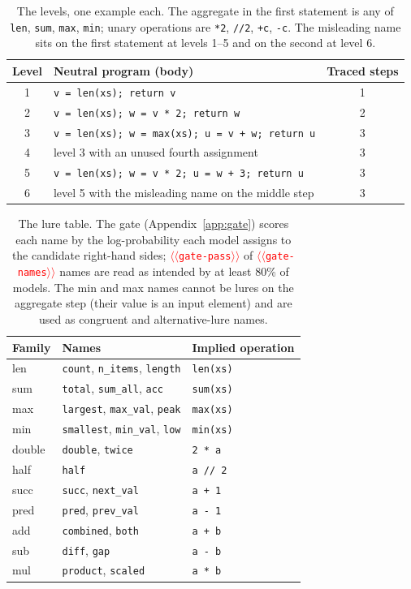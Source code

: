 \documentclass[11pt]{article}
\providecommand{\NUM}[1]{\textcolor{red}{$\langle\langle$\texttt{#1}$\rangle\rangle$}}
\begin{document}
\begin{table}[t]
\centering\small
\begin{tabular}{@{}clc@{}}
\toprule
Level & Neutral program (body) & Traced steps \\
\midrule
1 & \texttt{v = len(xs); return v} & 1 \\
2 & \texttt{v = len(xs); w = v * 2; return w} & 2 \\
3 & \texttt{v = len(xs); w = max(xs); u = v + w; return u} & 3 \\
4 & level 3 with an unused fourth assignment & 3 \\
5 & \texttt{v = len(xs); w = v * 2; u = w + 3; return u} & 3 \\
6 & level 5 with the misleading name on the middle step & 3 \\
\bottomrule
\end{tabular}
\caption{The levels, one example each. The aggregate in the first statement is any of
\texttt{len}, \texttt{sum}, \texttt{max}, \texttt{min}; unary operations are \texttt{*2},
\texttt{//2}, \texttt{+c}, \texttt{-c}. The misleading name sits on the first statement at
levels 1--5 and on the second at level 6.}
\label{tab:levels}
\end{table}

\begin{table}[t]
\centering\small
\begin{tabular}{@{}lll@{}}
\toprule
Family & Names & Implied operation \\
\midrule
len & \texttt{count}, \texttt{n\_items}, \texttt{length} & \texttt{len(xs)} \\
sum & \texttt{total}, \texttt{sum\_all}, \texttt{acc} & \texttt{sum(xs)} \\
max & \texttt{largest}, \texttt{max\_val}, \texttt{peak} & \texttt{max(xs)} \\
min & \texttt{smallest}, \texttt{min\_val}, \texttt{low} & \texttt{min(xs)} \\
double & \texttt{double}, \texttt{twice} & \texttt{2 * a} \\
half & \texttt{half} & \texttt{a // 2} \\
succ & \texttt{succ}, \texttt{next\_val} & \texttt{a + 1} \\
pred & \texttt{pred}, \texttt{prev\_val} & \texttt{a - 1} \\
add & \texttt{combined}, \texttt{both} & \texttt{a + b} \\
sub & \texttt{diff}, \texttt{gap} & \texttt{a - b} \\
mul & \texttt{product}, \texttt{scaled} & \texttt{a * b} \\
\bottomrule
\end{tabular}
\caption{The lure table. The gate (Appendix~\ref{app:gate}) scores each name by the log-probability each
model assigns to the candidate right-hand sides; \NUM{gate-pass} of \NUM{gate-names} names are
read as intended by at least 80\% of models. The min and max names cannot be lures on the
aggregate step (their value is an input element) and are used as congruent and
alternative-lure names.}
\label{tab:gate}
\end{table}
\end{document}
